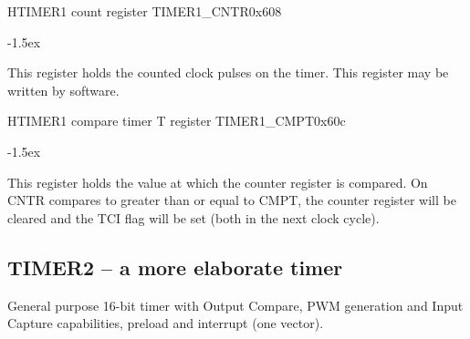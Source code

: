 \documentclass[12pt]{article}
\begin{document}
\begin{register}{H}{TIMER1 count register TIMER1\_CNTR}{0x608}
\label{timer1cntr}
\regnewline%
\end{register}
\begin{regdesc}[0.8\textwidth]\begin{reglist}[00000]
\itemsep-1.5ex
\item[CNTR] This register holds the counted clock pulses on the timer. This register may be written by software.
\end{reglist}\end{regdesc}

\begin{register}{H}{TIMER1 compare timer T register TIMER1\_CMPT}{0x60c}
\label{timer1cmpt}
\regnewline%
\end{register}
\begin{regdesc}[0.8\textwidth]\begin{reglist}[00000]
\itemsep-1.5ex
\item[CMPT] This register holds the value at which the counter register is compared. On CNTR compares to greater than or equal to CMPT, the counter register will be cleared and the TCI flag will be set (both in the next clock cycle).
\end{reglist}\end{regdesc}


\subsection{TIMER2 -- a more elaborate timer}
General purpose 16-bit timer with Output Compare, PWM generation and Input Capture capabilities, preload and interrupt (one vector).
\end{document}
